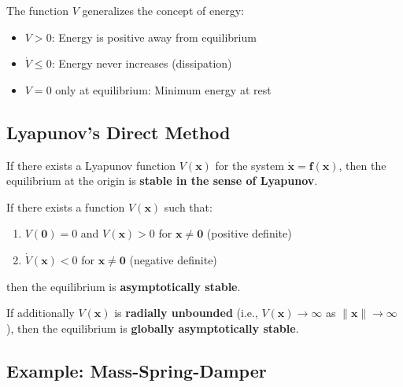 The function $V$ generalizes the concept of energy:
\begin{itemize}
    \item $V > 0$: Energy is positive away from equilibrium
    \item $\dot{V} \leq 0$: Energy never increases (dissipation)
    \item $V = 0$ only at equilibrium: Minimum energy at rest
\end{itemize}

\subsection{Lyapunov's Direct Method}

\begin{theorem}
\label{thm:lyapunov_stability}
If there exists a Lyapunov function $V(\mathbf{x})$ for the system $\dot{\mathbf{x}} = \mathbf{f}(\mathbf{x})$, then the equilibrium at the origin is \textbf{stable in the sense of Lyapunov}.
\end{theorem}

\begin{theorem}
\label{thm:lyapunov_asymptotic}
If there exists a function $V(\mathbf{x})$ such that:
\begin{enumerate}
    \item $V(\mathbf{0}) = 0$ and $V(\mathbf{x}) > 0$ for $\mathbf{x} \neq \mathbf{0}$ (positive definite)
    \item $\dot{V}(\mathbf{x}) < 0$ for $\mathbf{x} \neq \mathbf{0}$ (negative definite)
\end{enumerate}
then the equilibrium is \textbf{asymptotically stable}.
\end{theorem}

\begin{theorem}
\label{thm:lyapunov_global}
If additionally $V(\mathbf{x})$ is \textbf{radially unbounded} (i.e., $V(\mathbf{x}) \to \infty$ as $\|\mathbf{x}\| \to \infty$), then the equilibrium is \textbf{globally asymptotically stable}.
\end{theorem}

\subsection{Example: Mass-Spring-Damper}

